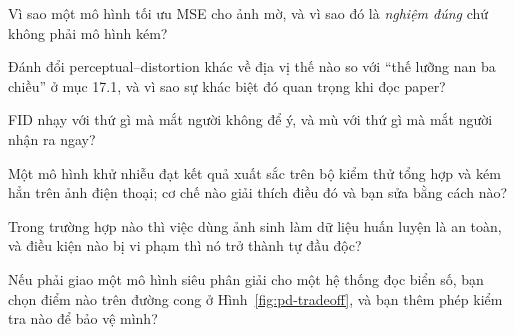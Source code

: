 \documentclass[../../../deep_learning.tex]{subfiles}
\begin{document}
\begin{tukiem}
\item Vì sao một mô hình tối ưu MSE cho ảnh mờ, và vì sao đó là \emph{nghiệm đúng} chứ không phải mô hình kém?
\item Đánh đổi perceptual--distortion khác về địa vị thế nào so với ``thế lưỡng nan ba chiều'' ở mục 17.1, và vì sao sự khác biệt đó quan trọng khi đọc paper?
\item FID nhạy với thứ gì mà mắt người không để ý, và mù với thứ gì mà mắt người nhận ra ngay?
\item Một mô hình khử nhiễu đạt kết quả xuất sắc trên bộ kiểm thử tổng hợp và kém hẳn trên ảnh điện thoại; cơ chế nào giải thích điều đó và bạn sửa bằng cách nào?
\item Trong trường hợp nào thì việc dùng ảnh sinh làm dữ liệu huấn luyện là an toàn, và điều kiện nào bị vi phạm thì nó trở thành tự đầu độc?
\item Nếu phải giao một mô hình siêu phân giải cho một hệ thống đọc biển số, bạn chọn điểm nào trên đường cong ở Hình~\ref{fig:pd-tradeoff}, và bạn thêm phép kiểm tra nào để bảo vệ mình?
\end{tukiem}
\ifSubfilesClassLoaded{\printbibliography[title={Nguồn}]}{}
\end{document}

